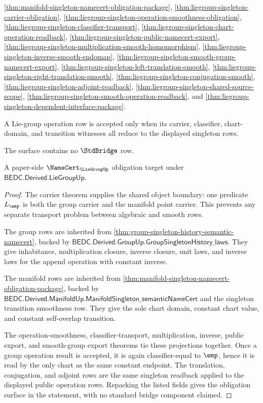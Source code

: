 \begin{theorem}
\begin{description}
\autoref{thm:manifold-singleton-namecert-obligation-package},
\autoref{thm:liegroup-singleton-carrier-obligation},
\autoref{thm:liegroup-singleton-operation-smoothness-obligation},
\autoref{thm:liegroup-singleton-classifier-transport},
\autoref{thm:liegroup-singleton-chart-operation-readback},
\autoref{thm:liegroup-singleton-public-namecert-export},
\autoref{thm:liegroup-singleton-multiplication-smooth-homomorphism},
\autoref{thm:liegroup-singleton-inverse-smooth-endomap},
\autoref{thm:liegroup-singleton-smooth-group-namecert-export},
\autoref{thm:liegroup-singleton-left-translation-smooth},
\autoref{thm:liegroup-singleton-right-translation-smooth},
\autoref{thm:liegroup-singleton-conjugation-smooth},
\autoref{thm:liegroup-singleton-adjoint-readback},
\autoref{thm:liegroup-singleton-shared-source-scope},
\autoref{thm:liegroup-singleton-smooth-operation-readback}, and
\autoref{thm:liegroup-singleton-dependent-interface-package}.
\item[Exactness.] A Lie-group operation row is accepted only when its carrier,
classifier, chart-domain, and transition witnesses all reduce to the displayed
singleton rows.
\item[No standard bridge.] The surface contains no $\StdBridge$ row.
\item[Status.] A paper-side $\NameCert_{\LieGroupUp}$ obligation target under
$\mathsf{BEDC.Derived.LieGroupUp}$.
\end{description}
\end{theorem}
\begin{proof}
The carrier theorem supplies the shared object boundary: one predicate
$L_{\emp}$ is both the group carrier and the manifold point carrier. This
prevents any separate transport problem between algebraic and smooth rows.

The group rows are inherited from
\autoref{thm:group-singleton-history-semantic-namecert}, backed by
$\mathsf{BEDC.Derived.GroupUp.GroupSingletonHistory\_laws}$. They give
inhabitance, multiplication closure, inverse closure, unit laws, and inverse
laws for the append operation with constant inverse.

The manifold rows are inherited from
\autoref{thm:manifold-singleton-namecert-obligation-package}, backed by
$\mathsf{BEDC.Derived.ManifoldUp.ManifoldSingleton\_semanticNameCert}$ and
the singleton transition smoothness row. They give the sole chart domain,
constant chart value, and constant self-overlap transition.

The operation-smoothness, classifier-transport, multiplication, inverse, public
export, and smooth-group export theorems tie these projections together. Once a
group operation result is accepted, it is again classifier-equal to $\emp$,
hence it is read by the only chart as the same constant endpoint. The
translation, conjugation, and adjoint rows are the same singleton readback
applied to the displayed public operation rows. Repacking the listed fields
gives the obligation surface in the statement, with no standard bridge component
claimed.
\end{proof}

